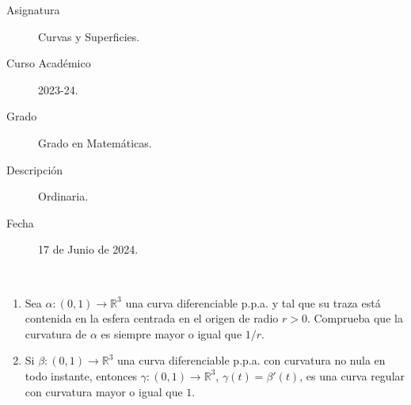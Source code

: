 \documentclass[12pt]{article}
\begin{document}

    
    

    \begin{description}
        \item[Asignatura] Curvas y Superficies.
        \item[Curso Académico] 2023-24.
        \item[Grado] Grado en Matemáticas.
        \item[Descripción] Ordinaria.
        \item[Fecha] 17 de Junio de 2024.  
    \end{description}
    \newpage



    \begin{ejercicio}~
        \begin{enumerate}
            \item[a)] Sea $\alpha : (0,1) \to \mathbb{R}^3$ una curva diferenciable p.p.a. y tal que su traza está contenida en la esfera centrada en el origen de radio $r > 0$. Comprueba que la curvatura de $\alpha$ es siempre mayor o igual que $1/r$.

            \item[b)] Si $\beta : (0,1) \to \mathbb{R}^3$ una curva diferenciable p.p.a. con curvatura no nula en todo instante, entonces $\gamma : (0,1) \to \mathbb{R}^3$, $\gamma(t)=\beta'(t)$, es una curva regular con curvatura mayor o igual que $1$.
        \end{enumerate}
    \end{ejercicio}
\end{document}
